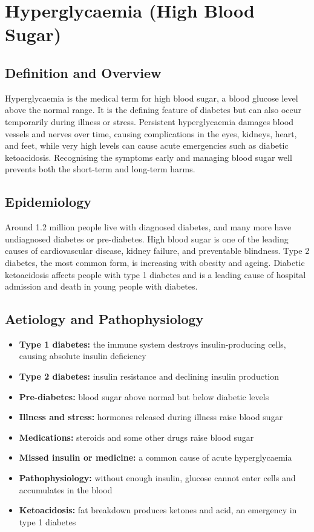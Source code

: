 \chapter{Hyperglycaemia (High Blood Sugar)}

\section*{Definition and Overview}
Hyperglycaemia is the medical term for high blood sugar, a blood glucose level above the normal range. It is the defining feature of diabetes but can also occur temporarily during illness or stress. Persistent hyperglycaemia damages blood vessels and nerves over time, causing complications in the eyes, kidneys, heart, and feet, while very high levels can cause acute emergencies such as diabetic ketoacidosis. Recognising the symptoms early and managing blood sugar well prevents both the short-term and long-term harms.

\section*{Epidemiology}
Around 1.2 million people live with diagnosed diabetes, and many more have undiagnosed diabetes or pre-diabetes. High blood sugar is one of the leading causes of cardiovascular disease, kidney failure, and preventable blindness. Type 2 diabetes, the most common form, is increasing with obesity and ageing. Diabetic ketoacidosis affects people with type 1 diabetes and is a leading cause of hospital admission and death in young people with diabetes.

\section*{Aetiology and Pathophysiology}
\begin{itemize}
    \item \textbf{Type 1 diabetes:} the immune system destroys insulin-producing cells, causing absolute insulin deficiency
    \item \textbf{Type 2 diabetes:} insulin resistance and declining insulin production
    \item \textbf{Pre-diabetes:} blood sugar above normal but below diabetic levels
    \item \textbf{Illness and stress:} hormones released during illness raise blood sugar
    \item \textbf{Medications:} steroids and some other drugs raise blood sugar
    \item \textbf{Missed insulin or medicine:} a common cause of acute hyperglycaemia
    \item \textbf{Pathophysiology:} without enough insulin, glucose cannot enter cells and accumulates in the blood
    \item \textbf{Ketoacidosis:} fat breakdown produces ketones and acid, an emergency in type 1 diabetes
\end{itemize}

